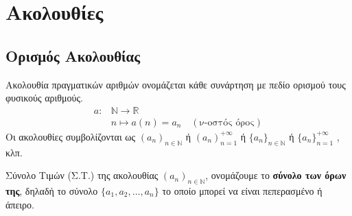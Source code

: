 





\pagestyle{vangelis}




\chapter{Ακολουθίες}

\section{Ορισμός Ακολουθίας}

\begin{mybox1}
  \begin{dfn}
    \textcolor{Col1}{Ακολουθία} πραγματικών αριθμών ονομάζεται 
    κάθε συνάρτηση με πεδίο ορισμού τους φυσικούς αριθμούς. 
    \begin{align*}
      a \colon &\mathbb{N} \to \mathbb{R} \\
               &n \mapsto a(n)=a_{n} \quad (\text{ν-οστός όρος})
    \end{align*} 
    Οι ακολουθίες συμβολίζονται ως $ (a_{n})_{n \in \mathbb{N}} $ 
    ή $ ( a_{n} ) _{n=1}^{+\infty}$  ή $ \{ a_{n} \} _{n \in \mathbb{N}} $ ή 
    $ \{ a_{n} \} _{n=1}^{+\infty}$ , κλπ.
  \end{dfn}
\end{mybox1}

\begin{mybox1}
  \begin{dfn}
    \textcolor{Col1}{Σύνολο Τιμών} (Σ.Τ.) της ακολουθίας 
    $ (a_{n})_{n \in \mathbb{N}} $, ονομάζουμε το \textbf{σύνολο των όρων της}, 
    δηλαδή το σύνολο $ \{ a_{1}, a_{2}, \ldots, a_{n} \} $ το οποίο μπορεί να 
    είναι πεπερασμένο ή άπειρο.
  \end{dfn}
\end{mybox1}

